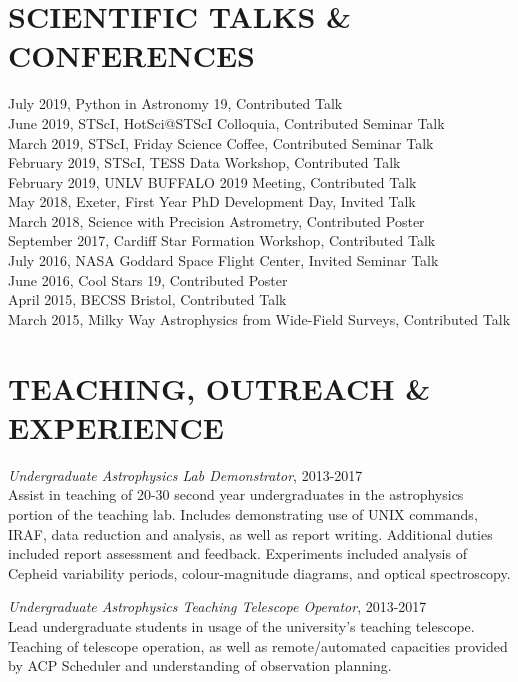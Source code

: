 \documentclass[letter, margin, 10pt]{res} %
\begin{document}
\begin{resume}
\section{SCIENTIFIC TALKS \& CONFERENCES}

July 2019, Python in Astronomy 19, Contributed Talk\\
June 2019, STScI, HotSci@STScI Colloquia, Contributed Seminar Talk\\
March 2019, STScI, Friday Science Coffee, Contributed Seminar Talk\\
February 2019, STScI, TESS Data Workshop, Contributed Talk\\
February 2019, UNLV BUFFALO 2019 Meeting, Contributed Talk\\
May 2018, Exeter, First Year PhD Development Day, Invited Talk\\
March 2018, Science with Precision Astrometry, Contributed Poster\\
September 2017, Cardiff Star Formation Workshop, Contributed Talk\\
July 2016, NASA Goddard Space Flight Center, Invited Seminar Talk\\
June 2016, Cool Stars 19, Contributed Poster\\
April 2015, BECSS Bristol, Contributed Talk\\
March 2015, Milky Way Astrophysics from Wide-Field Surveys, Contributed Talk\\

 
\section{TEACHING, OUTREACH \& EXPERIENCE}

{\sl Undergraduate Astrophysics Lab Demonstrator}, 2013-2017\\
Assist in teaching of 20-30 second year undergraduates in the astrophysics portion of the teaching lab. Includes demonstrating use of UNIX commands, IRAF, data reduction and analysis, as well as report writing. Additional duties included report assessment and feedback. Experiments included analysis of Cepheid variability periods, colour-magnitude diagrams, and optical spectroscopy.

{\sl Undergraduate Astrophysics Teaching Telescope Operator}, 2013-2017\\
Lead undergraduate students in usage of the university's teaching telescope. Teaching of telescope operation, as well as remote/automated capacities provided by ACP Scheduler and understanding of observation planning.


\end{resume}
\end{document}
